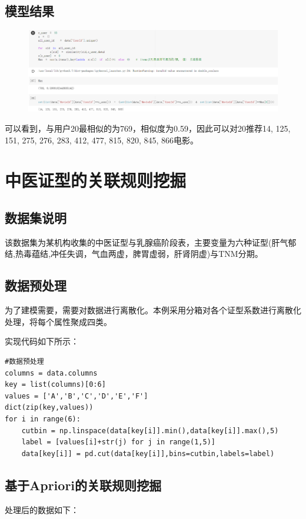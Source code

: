 \documentclass[withoutpreface,bwprint]{cumcmthesis} %
\begin{document}
\subsection{模型结果}
\begin{figure}[H]
	\centering
	\includegraphics[width=0.7\linewidth]{figures/72_2}
	\caption{}
	\label{fig:722}
\end{figure}
\par 可以看到，与用户20最相似的为769，相似度为0.59，因此可以对20推荐{14, 125, 151, 275, 276, 283, 412, 477, 815, 820, 845, 866}电影。


\newpage
\section{中医证型的关联规则挖掘}

\subsection{数据集说明}
\par 该数据集为某机构收集的中医证型与乳腺癌阶段表，主要变量为六种证型(肝气郁结,热毒蕴结,冲任失调，气血两虚，脾胃虚弱，肝肾阴虚)与TNM分期。


\subsection{数据预处理}
\par 为了建模需要，需要对数据进行离散化。本例采用分箱对各个证型系数进行离散化处理，将每个属性聚成四类。
\par 
\par 实现代码如下所示：
\begin{lstlisting}
#数据预处理
columns = data.columns
key = list(columns)[0:6]
values = ['A','B','C','D','E','F']
dict(zip(key,values))
for i in range(6):
	cutbin = np.linspace(data[key[i]].min(),data[key[i]].max(),5)
	label = [values[i]+str(j) for j in range(1,5)]
	data[key[i]] = pd.cut(data[key[i]],bins=cutbin,labels=label)
\end{lstlisting}

\subsection{基于Apriori的关联规则挖掘}
\par 处理后的数据如下：
\end{document}
